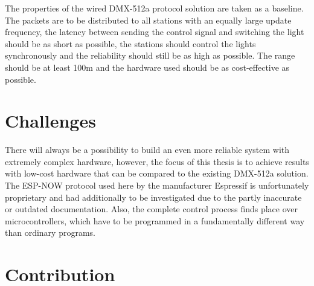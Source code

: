 The properties of the wired DMX-512a protocol solution are taken as a baseline.
The packets are to be distributed to all stations with an equally large update frequency,
the latency between sending the control signal and switching the light should be as short as possible,
the stations should control the lights synchronously and the reliability should still be as high as possible.
The range should be at least 100m and the hardware used should be as cost-effective as possible.

\section*{Challenges}

There will always be a possibility to build an even more reliable system with extremely complex hardware,
however, the focus of this thesis is to achieve results with low-cost hardware that can be compared 
to the existing DMX-512a solution.
The ESP-NOW protocol used here by the manufacturer Espressif is unfortunately proprietary
and had additionally to be investigated due to the partly inaccurate or outdated documentation.
Also, the complete control process finds place over microcontrollers, 
which have to be programmed in a fundamentally different way than ordinary programs.

\section*{Contribution}

